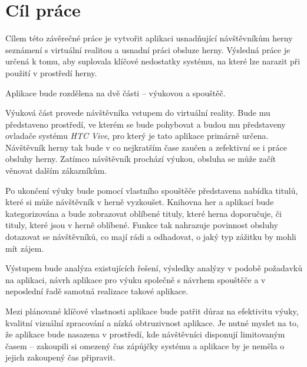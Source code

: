 \chapter{Cíl práce}\label{cuxedl-pruxe1ce}

Cílem této závěrečné práce je vytvořit aplikaci usnadňující návštěvníkům
herny seznámení s virtuální realitou a usnadní práci obsluze herny.
Výsledná práce je určená k tomu, aby suplovala klíčové nedostatky
systému, na které lze narazit při použití v prostředí herny.

Aplikace bude rozdělena na dvě části -- výukovou a spouštěč.

Výuková část provede návštěvníka vstupem do virtuální reality. Bude mu
představeno prostředí, ve kterém se bude pohybovat a budou mu
představeny ovladače systému \emph{HTC Vive}, pro který je tato aplikace
primárně určena. Návštěvník herny tak bude v co nejkratším čase zaučen a
zefektivní se i práce obsluhy herny. Zatímco návštěvník prochází výukou,
obsluha se může začít věnovat dalším zákazníkům.

Po ukončení výuky bude pomocí vlastního spouštěče představena nabídka
titulů, které si může návštěvník v herně vyzkoušet. Knihovna her a
aplikací bude kategorizována a bude zobrazovat oblíbené tituly, které
herna doporučuje, či tituly, které jsou v herně oblíbené. Funkce tak
nahrazuje povinnost obsluhy dotazovat se návštěvníků, co mají rádi a
odhadovat, o jaký typ zážitku by mohli mít zájem.

Výstupem bude analýza existujících řešení, výsledky analýzy v podobě
požadavků na aplikaci, návrh aplikace pro výuku společně s návrhem
spouštěče a v neposlední řadě samotná realizace takové aplikace.

Mezi plánované klíčové vlastnosti aplikace bude patřit důraz na efektivitu výuky,
kvalitní vizuální zpracování a nízká obtruzivnost aplikace. Je nutné
myslet na to, že aplikace bude nasazena v prostředí, kde návštěvníci
disponují limitovaným časem -- zakoupili si omezený čas zápůjčky systému
a aplikace by je neměla o jejich zakoupený čas připravit.

